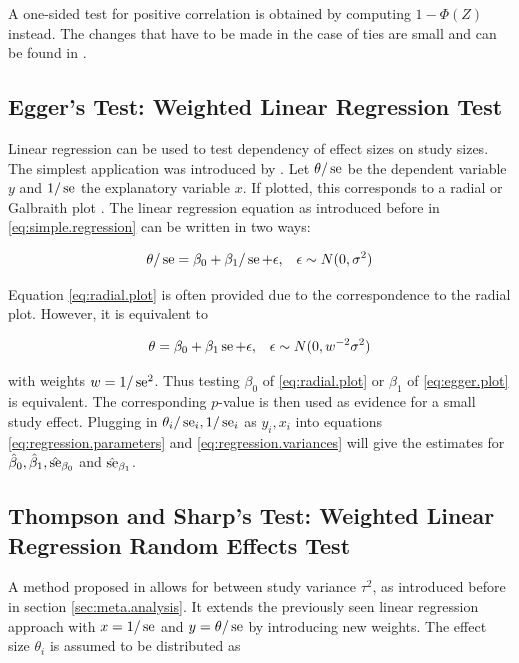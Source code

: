 \documentclass[11pt,a4paper,twoside]{book}\usepackage[]{graphicx}\usepackage[]{color}
\begin{document}
A one-sided test for positive correlation is obtained by computing $1-\Phi(Z)$ instead.
The changes that have to be made in the case of ties are small and can be found in \citet{begg.ties}.


\subsection{Egger's Test: Weighted Linear Regression Test} \label{sec:Egger}
Linear regression can be used to test dependency of effect sizes on study sizes. The simplest application was introduced by \citet{Egger}.
Let $\theta/\operatorname{se}$ be the dependent variable $y$ and $1/\operatorname{se}$ the explanatory variable $x$. If plotted, this corresponds to a radial or Galbraith plot \citep{galbraith}. The linear regression equation as introduced before in \eqref{eq:simple.regression} can be written in two ways:

\begin{align}
\theta/\operatorname{se} &= \beta_0 + \beta_1/\operatorname{se} + \epsilon, & \epsilon \sim N(0, \sigma^2) \label{eq:radial.plot} 
\end{align}

Equation \eqref{eq:radial.plot} is often provided due to the correspondence to the radial plot. However, it is equivalent to

\begin{align}
\theta &= \beta_0 + \beta_1 \operatorname{se} + \epsilon, & \epsilon \sim N(0, w^{-2}\sigma^2) \label{eq:egger.plot}
\end{align}

with weights $w = 1/\operatorname{se}^2$. Thus testing $\beta_0$ of \eqref{eq:radial.plot} or $\beta_1$ of \eqref{eq:egger.plot} is equivalent. The corresponding  $p$\hspace{0.4mm}-value is then used as evidence for a small study effect. Plugging in  $\theta_i/\operatorname{se}_i, 1/\operatorname{se}_i$ as $y_i, x_i$ into equations \eqref{eq:regression.parameters} and \eqref{eq:regression.variances} will give the estimates for $\hat{\beta}_0, \hat{\beta}_1,\hat{\operatorname{se}}_{\beta_0}$ and $\hat{\operatorname{se}}_{\beta_1}$.



\subsection{Thompson and Sharp's Test: Weighted Linear Regression Random Effects Test} \label{sec:Thompson}
A method proposed in \citet{thompson.sharp} allows for between study variance $\tau^2$, as introduced before in section \ref{sec:meta.analysis}. It extends the previously seen linear regression approach with $x = 1/\operatorname{se}$ and $y = \theta/\operatorname{se}$ by introducing new weights. The effect size $\theta_i$ is assumed to be distributed as
\end{document}

